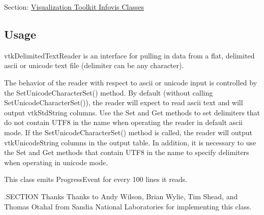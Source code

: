 Section\-: \hyperlink{sec_vtkinfovis}{Visualization Toolkit Infovis Classes} \hypertarget{vtkwidgets_vtkxyplotwidget_Usage}{}\subsection{Usage}\label{vtkwidgets_vtkxyplotwidget_Usage}
vtk\-Delimited\-Text\-Reader is an interface for pulling in data from a flat, delimited ascii or unicode text file (delimiter can be any character).

The behavior of the reader with respect to ascii or unicode input is controlled by the Set\-Unicode\-Character\-Set() method. By default (without calling Set\-Unicode\-Character\-Set()), the reader will expect to read ascii text and will output vtk\-Std\-String columns. Use the Set and Get methods to set delimiters that do not contain U\-T\-F8 in the name when operating the reader in default ascii mode. If the Set\-Unicode\-Character\-Set() method is called, the reader will output vtk\-Unicode\-String columns in the output table. In addition, it is necessary to use the Set and Get methods that contain U\-T\-F8 in the name to specify delimiters when operating in unicode mode.

This class emits Progress\-Event for every 100 lines it reads.

.S\-E\-C\-T\-I\-O\-N Thanks Thanks to Andy Wilson, Brian Wylie, Tim Shead, and Thomas Otahal from Sandia National Laboratories for implementing this class.


